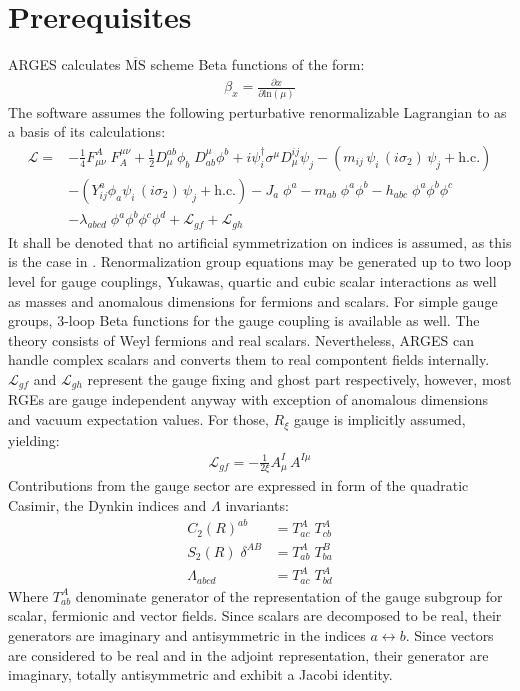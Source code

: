 \documentclass{scrartcl}
\begin{document}
\section{Prerequisites}
ARGES calculates $\overline{\mathrm{MS}}$ scheme Beta functions of the form:
\begin{align}
\beta_x = \frac{\partial x}{\partial \mathrm{ln}(\mu)}
\end{align}
The software assumes the following perturbative renormalizable Lagrangian to as a basis of its calculations:
\begin{align}
\mathcal{L} = &-\frac{1}{4} F^A_{\mu\nu}\; F_A^{\mu \nu} + \frac{1}{2} D^{ab}_\mu \phi_b \; D_{ab}^\mu \phi^b + i \psi_i^\dagger \sigma^\mu D^{ij}_\mu \psi_j  - ( m_{ij}\, \psi_i \,(i \sigma_2)\, \psi_j + \mathrm{h.c.} )\nonumber \\
&- ( Y^a_{ij} \phi_a \psi_i \,(i \sigma_2)\, \psi_j + \mathrm{h.c.} ) - J_a \;\phi^a - m_{ab}\; \phi^a \phi^b - h_{abc}\; \phi^a \phi^b \phi^c \nonumber\\ &- \lambda_{abcd}\; \phi^a \phi^b \phi^c \phi^d  + \mathcal{L}_{gf} + \mathcal{L}_{gh}
\end{align}
It shall be denoted that no artificial symmetrization on indices is assumed, as this is the case in \cite{LuoWangXiao,MV1,MV2,MV3,vev1,vev2,gauge3L,gauge3L2}.
Renormalization group equations may be generated up to two loop level for gauge couplings, Yukawas, quartic and cubic scalar interactions as well as masses and anomalous dimensions for fermions and scalars. For simple gauge groups, 3-loop Beta functions for the gauge coupling is available as well.
The theory consists of Weyl fermions and real scalars. Nevertheless, ARGES can handle complex scalars and converts them to real compontent fields internally.
$\mathcal{L}_{gf}$ and $\mathcal{L}_{gh}$ represent the gauge fixing and ghost part respectively, however, most RGEs are gauge independent anyway with exception of anomalous dimensions and vacuum expectation values. For those, $R_\xi$ gauge is implicitly assumed, yielding:
\begin{align}
\mathcal{L}_{gf} = -\frac{1}{2 \xi} A^I_\mu \,A^{I \mu} 
\end{align}
Contributions from the gauge sector are expressed in form of the quadratic Casimir, the Dynkin indices and $\Lambda$ invariants:
\begin{align}
C_2(R)^{ab} &= T^A_{ac} \;T^A_{cb} \\
S_2(R) \;\delta^{AB} &= T^A_{ab} \; T^B_{ba} \\
\Lambda_{abcd} &= T^A_{ac} \; T^A_{bd}
\end{align}
Where $T^A_{ab}$ denominate generator of the representation of the gauge subgroup for scalar, fermionic and vector fields. Since scalars are decomposed to be real, their generators are imaginary and antisymmetric in the indices $a \leftrightarrow b$. Since vectors are considered to be real and in the adjoint representation, their generator are imaginary, totally antisymmetric and exhibit a Jacobi identity.
\newpage
\end{document}
